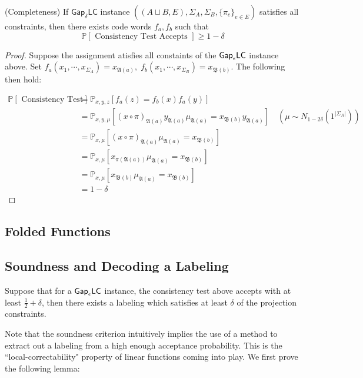 \begin{proposition} (Completeness)
  If $\mathsf{Gap}_\delta\mathsf{LC}$ instance $((A\sqcup B,E),\Sigma_A,\Sigma_B,\{\pi_e\}_{e \in E})$ satisfies all constraints, then there exists code words $f_a, f_b$ such that
  \begin{equation}
    \mathbb{P}[ \text{ Consistency Test Accepts } ] \geq 1 - \delta
  \end{equation}
\end{proposition}
\begin{proof}
  Suppose the assignment atisfies all constaints of the $\mathsf{Gap}_\epsilon\mathsf{LC}$ instance above. Set $f_a(x_1,\cdots, x_{\Sigma_A}) = x_{\mathfrak{A}(a)}, \; f_b(x_1,\cdots, x_{\Sigma_B}) = x_{\mathfrak{B}(b)}$. The following then hold:

  \begin{align*}
      \mathbb{P}[ \text{ Consistency Test Accepts } ] & = \mathbb{P}_{x,y,z}\left[f_a(z) = f_b(x)f_a(y) \right] \\
      & = \mathbb{P}_{x,y, \mu}\left[ (x \circ \pi)_{\mathfrak{A}(a)}y_{\mathfrak{A}(a)}\mu_{\mathfrak{A}(a)} = x_{\mathfrak{B}(b)}y_{\mathfrak{A}(a)}  \right] \quad (\mu \sim N_{1 - 2\delta}(1^{|\Sigma_A|})) \\
      & = \mathbb{P}_{x,\mu} \left[(x \circ \pi)_{\mathfrak{A}(a)}\mu_{\mathfrak{A}(a)} = x_{\mathfrak{B}(b)} \right] \\
      & =  \mathbb{P}_{x,\mu} \left[x_{\pi(\mathfrak{A}(a))}\mu_{\mathfrak{A}(a)} = x_{\mathfrak{B}(b)} \right]\\
      & =  \mathbb{P}_{x,\mu} \left[x_{\mathfrak{B}(b)}\mu_{\mathfrak{A}(a)} = x_{\mathfrak{B}(b)} \right] \\
      & = 1 - \delta
  \end{align*}
\end{proof}
%
%

\subsection{Folded Functions}

\subsection{Soundness and Decoding a Labeling}

\begin{proposition}
  Suppose that for a $\mathsf{Gap}_\epsilon\mathsf{LC}$ instance, the consistency test above accepts with at least $\frac{1}{2} + \delta$,  then there exists a labeling which satisfies at least $\delta$ of the projection constraints.
\end{proposition}
Note that the soundness criterion intuitively implies the use of a method to extract out a labeling from a high enough acceptance probability. This is the ``local-correctability" property of linear functions coming into play. We first prove the following lemma:

